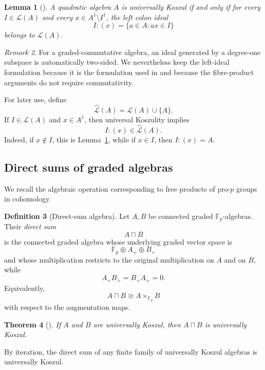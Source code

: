 \documentclass[12pt]{amsart}
\theoremstyle{plain}
\newtheorem{theorem}{Theorem}[section]
\newtheorem{lemma}[theorem]{Lemma}
\theoremstyle{definition}
\newtheorem{definition}[theorem]{Definition}
\theoremstyle{remark}
\newtheorem{remark}[theorem]{Remark}
\numberwithin{equation}{section}
\newcommand{\Fp}{\mathbb{F}_p}
\begin{document}
\begin{lemma}[{\cite[Proposition~20]{MinacPalaistiPasiniTan}}]
\label{lem:colon-criterion}
A quadratic algebra \(A\) is universally Koszul if and only if for
every \(I\in\mathcal L(A)\) and every \(x\in A^1\setminus I^1\), the
left colon ideal
\[
I:(x)=\{a\in A: ax\in I\}
\]
belongs to \(\mathcal L(A)\).
\end{lemma}

\begin{remark}
For a graded-commutative algebra, an ideal generated by a degree-one
subspace is automatically two-sided. We nevertheless keep the
left-ideal formulation because it is the formulation used in
\cite{MinacPalaistiPasiniTan} and because the fibre-product arguments
do not require commutativity.
\end{remark}

For later use, define
\[
\widehat{\mathcal L}(A)=\mathcal L(A)\cup\{A\}.
\]
If \(I\in\mathcal L(A)\) and \(x\in A^1\), then universal Koszulity
implies
\[
I:(x)\in\widehat{\mathcal L}(A).
\]
Indeed, if \(x\notin I\), this is Lemma~\ref{lem:colon-criterion}, while
if \(x\in I\), then \(I:(x)=A\).

\subsection{Direct sums of graded algebras}

We recall the algebraic operation corresponding to free products of
pro-\(p\) groups in cohomology.

\begin{definition}[Direct-sum algebra]
\label{def:directsum}
Let \(A,B\) be connected graded \(\Fp\)-algebras. Their \emph{direct sum}
\[
A\sqcap B
\]
is the connected graded algebra whose underlying graded vector space is
\[
\Fp\oplus A_+\oplus B_+
\]
and whose multiplication restricts to the original multiplication on
\(A\) and on \(B\), while
\[
A_+B_+=B_+A_+=0.
\]
Equivalently,
\[
A\sqcap B\cong A\times_{\Fp}B
\]
with respect to the augmentation maps.
\end{definition}

\begin{theorem}[{\cite[Proposition~30]{MinacPalaistiPasiniTan}}]
\label{thm:directsum-uk}
If \(A\) and \(B\) are universally Koszul, then
\(A\sqcap B\) is universally Koszul.
\end{theorem}

By iteration, the direct sum of any finite family of universally
Koszul algebras is universally Koszul.
\end{document}
